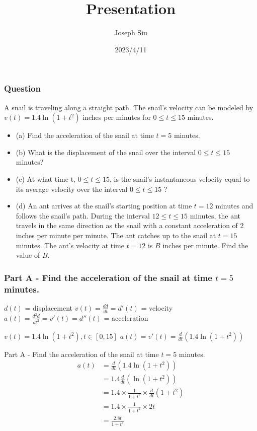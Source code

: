 \documentclass{beamer}
\title{Presentation}
\author{Joseph Siu}
\institute{MCV4U - Ms. Issaeva}
\date{2023/4/11}
\begin{document}
\frame{\titlepage}

\begin{frame}
    \frametitle{Question}
    A snail is traveling along a straight path. The snail's velocity can be modeled by $v(t) = 1.4\ln(1+t^2)$ inches per minutes for $0\leq t\leq 15$ minutes.
    \begin{itemize}
        \item<1-> (a) Find the acceleration of the snail at time $t=5$ minutes.
        \item<2-> (b) What is the displacement of the snail over the interval $0\leq t\leq 15$ minutes?
        \item<3-> (c) At what time t, $0\leq t\leq 15$, is the snail's instantaneous velocity equal to its average velocity over the interval $0\leq t\leq 15$ ?
        \item<4-> (d) An ant arrives at the snail's starting position at time $t=12$ minutes and follows the snail's path. During the interval $12\leq t\leq 15$ minutes, the ant travels in the same direction as the snail with a constant acceleration of 2 inches per minute per minute. The ant catches up to the snail at $t=15$ minutes. The ant's velocity at time $t=12$ is $B$ inches per minute. Find the value of $B$. 
    \end{itemize}
\end{frame}









\begin{frame}
    \frametitle{Part A - Find the acceleration of the snail at time $t=5$ minutes.}
    $d(t)$ = displacement \newline
    $v(t) = \frac{dd}{dt} = d'(t)$ = velocity \newline
    $a(t) = \frac{d^2d}{dt^2} = v'(t) = d''(t)$ = acceleration \newline
    \pause
    
    $v(t) = 1.4\ln(1+t^2), t\in [0,15]$ \newline
    $a(t) = v'(t) = \frac{d}{dt}(1.4\ln(1+t^2))$
\end{frame}

\begin{frame}{Part A - Find the acceleration of the snail at time $t=5$ minutes.}
    \begin{align*}
        a(t) &= \frac{d}{dt}(1.4\ln(1+t^2))\\
        &= 1.4\frac{d}{dt}(\ln(1+t^2))\\
        &= 1.4\times \frac{1}{1+t^2} \times \frac{d}{dt}(1+t^2)\\
        &= 1.4\times \frac{1}{1+t^2} \times 2t\\
        &= \frac{2.8t}{1+t^2}\\
    \end{align*}
\end{frame}
\end{document}
